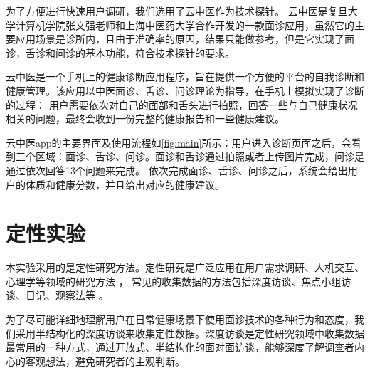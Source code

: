 为了方便进行快速用户调研，我们选用了云中医\cite{Zhang2018Study}作为技术探针。
云中医是复旦大学计算机学院张文强老师和上海中医药大学合作开发的一款面诊应用，虽然它的主要应用场景是诊所内，且由于准确率的原因，结果只能做参考，但是它实现了面诊，舌诊和问诊的基本功能，符合技术探针的要求。

云中医是一个手机上的健康诊断应用程序，旨在提供一个方便的平台的自我诊断和健康管理。该应用以中医面诊、舌诊、问诊理论为指导，在手机上模拟实现了诊断的过程：
用户需要依次对自己的面部和舌头进行拍照，回答一些与自己健康状况相关的问题，最终会收到一份完整的健康报告和一些健康建议。

云中医app的主要界面及使用流程如\ref{fig:main}所示：用户进入诊断页面之后，会看到三个区域：面诊、舌诊、问诊。面诊和舌诊通过拍照或者上传图片完成，问诊是通过依次回答13个问题来完成。
依次完成面诊、舌诊、问诊之后，系统会给出用户的体质和健康分数，并且给出对应的健康建议。

\section{定性实验}
 
本实验采用的是定性研究方法。定性研究是广泛应用在用户需求调研、人机交互、心理学等领域的研究方法 \cite{崔岩2011统计分析中的定量与定性研究}， 常见的收集数据的方法包括深度访谈、焦点小组访谈、日记、观察法等 \cite{李晓凤2006质性研究方法}。

为了尽可能详细地理解用户在日常健康场景下使用面诊技术的各种行为和态度，我们采用半结构化的深度访谈来收集定性数据\cite{DiciccoThe}。深度访谈是定性研究领域中收集数据最常用的一种方式，通过开放式、半结构化的面对面访谈，能够深度了解调查者内心的客观想法，避免研究者的主观判断。

